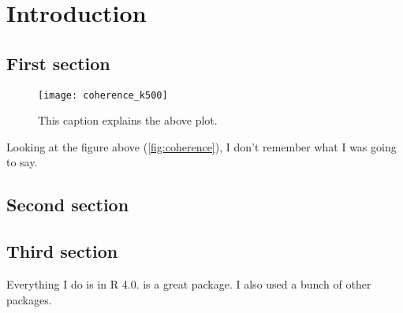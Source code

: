 \chapter{Introduction}

\section{First section}

\lipsum[3-4]

\begin{figure}[h]
	\centering
	\texttt{[image: coherence\_k500]}
	\caption{\label{fig:coherence}This caption explains the above plot.}
\end{figure}

\lipsum[5]
Looking at the figure above (\autoref{fig:coherence}), I don't remember what I was going to say.


\section{Second section}

\lipsum[6-7]

\section{Third section}

Everything I do is in R 4.0\supercite{R-4.0.0}. \supercite{purrr} is a great package. I also used a
bunch of other packages\supercite{qs,dplyr,ggplot2}.

\printbibliography[title={First bibliography}]
